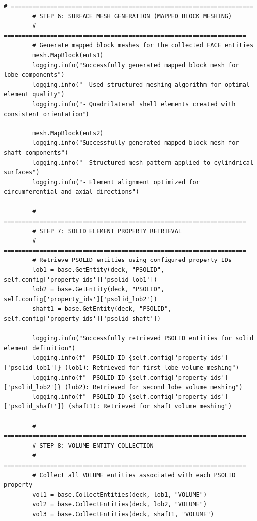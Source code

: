\documentclass{book}
\begin{document}
\begin{itemize}[leftmargin=*,label=\textbullet]
\begin{itemize}
\begin{lstlisting}[caption={Phase 1 Meshing Automation Script},label={lst:phase1}]
        # ====================================================================
        # STEP 6: SURFACE MESH GENERATION (MAPPED BLOCK MESHING)
        # ====================================================================
        # Generate mapped block meshes for the collected FACE entities
        mesh.MapBlock(ents1)
        logging.info("Successfully generated mapped block mesh for lobe components")
        logging.info("- Used structured meshing algorithm for optimal element quality")
        logging.info("- Quadrilateral shell elements created with consistent orientation")
        
        mesh.MapBlock(ents2)
        logging.info("Successfully generated mapped block mesh for shaft components")
        logging.info("- Structured mesh pattern applied to cylindrical surfaces")
        logging.info("- Element alignment optimized for circumferential and axial directions")
        
        # ====================================================================
        # STEP 7: SOLID ELEMENT PROPERTY RETRIEVAL
        # ====================================================================
        # Retrieve PSOLID entities using configured property IDs
        lob1 = base.GetEntity(deck, "PSOLID", self.config['property_ids']['psolid_lob1'])
        lob2 = base.GetEntity(deck, "PSOLID", self.config['property_ids']['psolid_lob2'])
        shaft1 = base.GetEntity(deck, "PSOLID", self.config['property_ids']['psolid_shaft'])
        
        logging.info("Successfully retrieved PSOLID entities for solid element definition")
        logging.info(f"- PSOLID ID {self.config['property_ids']['psolid_lob1']} (lob1): Retrieved for first lobe volume meshing")
        logging.info(f"- PSOLID ID {self.config['property_ids']['psolid_lob2']} (lob2): Retrieved for second lobe volume meshing")
        logging.info(f"- PSOLID ID {self.config['property_ids']['psolid_shaft']} (shaft1): Retrieved for shaft volume meshing")
        
        # ====================================================================
        # STEP 8: VOLUME ENTITY COLLECTION
        # ====================================================================
        # Collect all VOLUME entities associated with each PSOLID property
        vol1 = base.CollectEntities(deck, lob1, "VOLUME")
        vol2 = base.CollectEntities(deck, lob2, "VOLUME")
        vol3 = base.CollectEntities(deck, shaft1, "VOLUME")
        

\end{lstlisting}
\end{itemize}
\end{itemize}
\end{document}
